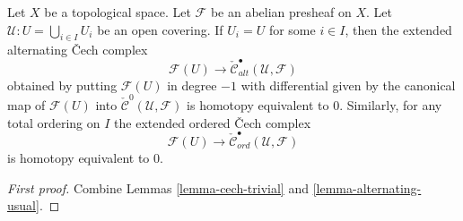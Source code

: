 \begin{lemma}
\label{lemma-alternating-cech-trivial}
Let $X$ be a topological space. Let $\mathcal{F}$ be an abelian presheaf on $X$.
Let $\mathcal{U} : U = \bigcup_{i \in I} U_i$ be an open covering. If
$U_i = U$ for some $i \in I$, then the extended alternating {\v C}ech complex
$$
\mathcal{F}(U) \to \check{\mathcal{C}}_{alt}^\bullet(\mathcal{U}, \mathcal{F})
$$
obtained by putting $\mathcal{F}(U)$ in degree $-1$ with differential given by
the canonical map of $\mathcal{F}(U)$ into
$\check{\mathcal{C}}^0(\mathcal{U}, \mathcal{F})$
is homotopy equivalent to $0$. Similarly, for any total ordering on $I$
the extended ordered {\v C}ech complex
$$
\mathcal{F}(U) \to
\check{\mathcal{C}}_{ord}^\bullet(\mathcal{U}, \mathcal{F})
$$
is homotopy equivalent to $0$.
\end{lemma}

\begin{proof}[First proof]
Combine Lemmas \ref{lemma-cech-trivial} and \ref{lemma-alternating-usual}.
\end{proof}

